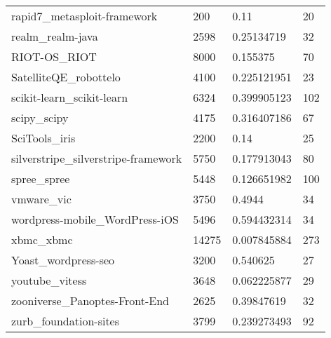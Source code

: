 \begin{center}
\begin{longtable}{l|l|l|l}
rapid7\_metasploit-framework                 & 200      & 0.11            & 20  \\
realm\_realm-java                            & 2598     & 0.25134719      & 32  \\
RIOT-OS\_RIOT                                & 8000     & 0.155375        & 70  \\
SatelliteQE\_robottelo                       & 4100     & 0.225121951     & 23  \\
scikit-learn\_scikit-learn                   & 6324     & 0.399905123     & 102 \\
scipy\_scipy                                 & 4175     & 0.316407186     & 67  \\
SciTools\_iris                               & 2200     & 0.14            & 25  \\
silverstripe\_silverstripe-framework         & 5750     & 0.177913043     & 80  \\
spree\_spree                                 & 5448     & 0.126651982     & 100 \\
vmware\_vic                                  & 3750     & 0.4944          & 34  \\
wordpress-mobile\_WordPress-iOS              & 5496     & 0.594432314     & 34  \\
xbmc\_xbmc                                   & 14275    & 0.007845884     & 273 \\
Yoast\_wordpress-seo                         & 3200     & 0.540625        & 27  \\
youtube\_vitess                              & 3648     & 0.062225877     & 29  \\
zooniverse\_Panoptes-Front-End               & 2625     & 0.39847619      & 32  \\
zurb\_foundation-sites                       & 3799     & 0.239273493     & 92 \\
\end{longtable}
\end{center}
